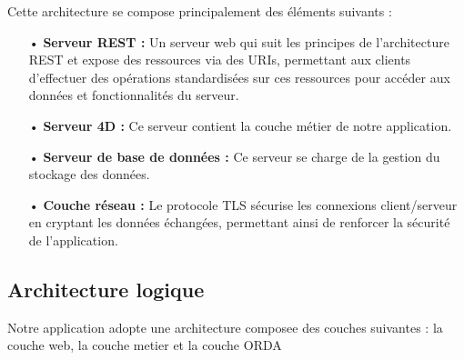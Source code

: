Cette architecture se compose principalement des éléments suivants :
\begin{itemize}
   \item[•] \textbf{Serveur REST :} Un serveur web qui suit les principes de l’architecture REST et expose des ressources via des URIs, permettant aux clients d’effectuer des opérations standardisées sur ces ressources pour accéder aux données et fonctionnalités du serveur.
   \item[•] \textbf{Serveur 4D :} Ce serveur contient la couche métier de notre application.
   \item[•] \textbf{Serveur de base de données :} Ce serveur se charge de la gestion du stockage des données.
   \item[•] \textbf{Couche réseau :} Le protocole TLS sécurise les connexions client/serveur en cryptant les données échangées, permettant ainsi de renforcer la sécurité de l'application.
\end{itemize}

\subsection{Architecture logique}

Notre application adopte une architecture composee des couches suivantes : la couche web, la couche metier et la couche ORDA

